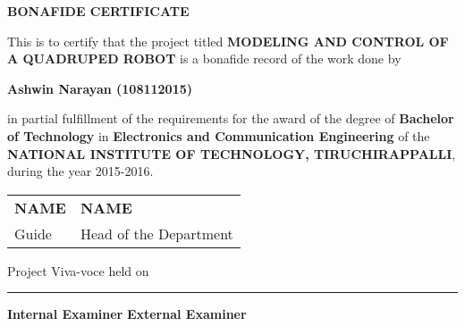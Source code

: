 \thispagestyle{plain}
\begin{center}
\textbf{BONAFIDE CERTIFICATE}
\end{center}

\vspace{0.3cm}
\fontsize{12pt}{24pt}\selectfont This is to certify that the project titled \textbf{MODELING AND CONTROL OF A QUADRUPED ROBOT} is a bonafide record of the work done by
\vspace{0.3cm}

\begin{center}
\textbf{Ashwin Narayan (108112015)}
\end{center}

\vspace{0.3cm}
\noindent
\fontsize{12pt}{24pt}\selectfont in partial fulfillment of the requirements for the award of the degree of \textbf{Bachelor of Technology} in \textbf{Electronics and Communication Engineering} of the \textbf{NATIONAL INSTITUTE OF TECHNOLOGY, TIRUCHIRAPPALLI}, during the year 2015-2016.

\vspace{3cm}

\begin{tabu} to \textwidth { X[l] X[c] }

 \textbf{NAME} & \textbf{NAME} \\
 Guide & Head of the Department

\end{tabu}

\vspace{4cm}
Project Viva-voce held on \rule{5.5cm}{.1pt}

\vspace{4cm}
\textbf{Internal Examiner} \hfill \textbf{External Examiner}

\newpage
